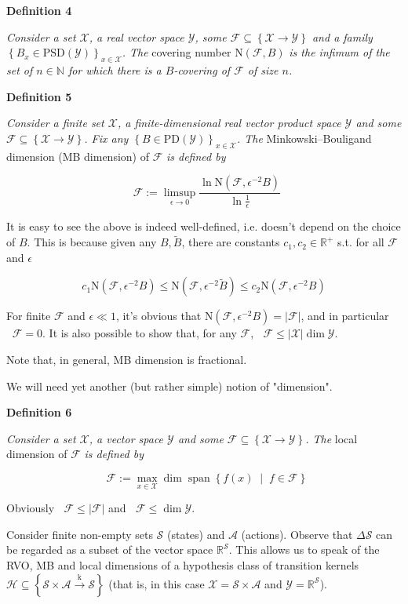 \documentclass[a4paper]{article}
\newcommand{\Co}[1]{}
\DeclareMathOperator{\Sp}{span}
\newcommand{\AP}[1]{\left(#1\right)}
\newcommand{\AC}[1]{\left\{#1\right\}}
\newcommand{\ACM}[2]{\left\{#1\;\middle\vert\;#2\right\}}
\newcommand{\Nats}{\mathbb{N}}
\newcommand{\Reals}{\mathbb{R}}
\newcommand{\PD}{\mathrm{PD}}
\newcommand{\PSD}{\mathrm{PSD}}
\newcommand{\Abs}[1]{\left\vert #1 \right\vert}
\newcommand{\K}{\xrightarrow{\mathrm{k}}}
\newcommand{\B}{B}
\newcommand{\X}{\mathcal{X}}
\newcommand{\Y}{\mathcal{Y}}
\newcommand{\F}{\mathcal{F}}
\newcommand{\St}{\mathcal{S}}
\newcommand{\A}{\mathcal{A}}
\newcommand{\Hy}{\mathcal{H}}
\DeclareMathOperator{\MB}{\dim_{MB}}
\DeclareMathOperator{\LD}{\dim_{loc}}
\newcommand{\N}{\mathrm{N}}
\begin{document}
\textbf{Definition 4}\Co{b}

\textit{Consider a set $\X$, a real vector space $\Y$, some $\F\subseteq\AC{\X\rightarrow\Y}$ and a family $\AC{\B _x\in\PSD(\Y)}_{x\in\X}$. The}\Co{i} covering number $\N(\F,\B )$ \textit{is the infimum of the set of $n\in\Nats$ for which there is a $\B $-covering of $\F$ of size $n$.}\Co{i}

\textbf{Definition 5}\Co{b}

\textit{Consider a finite set $\X$, a finite-dimensional real vector product space $\Y$ and some $\F\subseteq\AC{\X\rightarrow\Y}$. Fix any $\AC{\B \in\PD(\Y)}_{x\in\X}$.  The}\Co{i} Minkowski–Bouligand dimension (MB dimension) of $\F$ \textit{is defined by}\Co{i}

$$\MB{\F}:=\limsup_{\epsilon \rightarrow 0}{\frac{\ln{\N\AP{\F,\epsilon^{-2} \B }}}{\ln\frac{1}{\epsilon}}}$$

It is easy to see the above is indeed well-defined, i.e. doesn't depend on the choice of $\B $. This is because given any $\B ,\tilde{\B }$, there are constants $c_1,c_2\in\Reals^+$ s.t. for all $\F$ and $\epsilon$

$$c_1 \N\AP{\F,\epsilon^{-2} \B } \leq \N\AP{\F,\epsilon^{-2} \tilde{\B }} \leq c_2\N\AP{\F,\epsilon^{-2} \B }$$

For finite $\F$ and $\epsilon\ll1$, it's obvious that $\N\AP{\F,\epsilon^{-2}\B }=\Abs{\F}$, and in particular $\MB\F=0$. It is also possible to show that, for any $\F$, $\MB{\F}\leq\Abs{\X}\dim{\Y}$.

Note that, in general, MB dimension is fractional.

We will need yet another (but rather simple) notion of "dimension".

\textbf{Definition 6}\Co{b}

\textit{Consider a set $\X$, a vector space $\Y$ and some $\F\subseteq\AC{\X\rightarrow\Y}$. The}\Co{i} local dimension of $\F$ \textit{is defined by}\Co{i}

$$\LD{\F}:=\max_{x\in\X}{\dim\Sp\ACM{f(x)}{f\in\F}}$$

Obviously $\LD{\F}\leq\Abs{\F}$ and $\LD{\F}\leq\dim{\Y}$.

Consider finite non-empty sets $\St$ (states) and $\A$ (actions). Observe that $\Delta\St$ can be regarded as a subset of the vector space $\Reals^\St$. This allows us to speak of the RVO, MB and local dimensions of a hypothesis class of transition kernels $\Hy\subseteq\AC{\St\times\A\K\St}$ (that is, in this case $\X=\St\times\A$ and $\Y=\Reals^\St$). 
\end{document}
